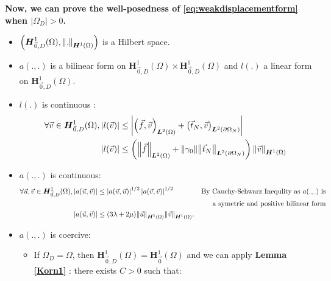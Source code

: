 \documentclass[a4paper,12pt,twoside]{report}
\begin{document}
\noindent \textbf{Now, we can prove the well-posedness of \eqref{eq:weakdisplacementform} when $\left| \Omega_D \right| > 0$.}
\begin{itemize}
    \item $\left(\boldsymbol H^1_{\vec 0,D}(\Omega), \norm{.}_{\boldsymbol H^1(\Omega)} \right)$ is a Hilbert space.
    \item $a(.,.)$ is a bilinear form on $\boldsymbol H^1_{\vec 0,D}(\Omega) \times \boldsymbol H^1_{\vec 0,D}(\Omega)$ and $l(.)$ a linear form on $\boldsymbol H^1_{\vec 0,D}(\Omega)$.
    \item $l(.)$ is continuous : \begin{equation*}
    \begin{aligned}    
    \forall \vec v \in \boldsymbol H^1_{\vec 0,D}(\Omega), \left|l(\vec v)\right| 
    & \leq \left| \left(\vec f, \vec v \right)_{\boldsymbol L^2(\Omega)} + \left(\vec t_N, \vec v \right)_{\boldsymbol L^2(\partial \Omega_N)} \right| \\
    \left|l(\vec v)\right| 
    & \leq \left( \norm{\vec f}_{\boldsymbol L^2(\Omega)} + \norm{\gamma_0} \norm{\vec t_N}_{\boldsymbol L^2(\partial \Omega_N)}\right)\norm{\vec v}_{\boldsymbol H^1(\Omega)}\\
    \end{aligned}
    \end{equation*}
    \item $a(.,.)$ is continuous: 
    \begin{equation*}
        \begin{aligned}
        \forall \vec u, \vec v \in \boldsymbol H^1_{\vec 0,D}(\Omega), \left| a(\vec u, \vec v) \right| 
        & \leq \left| a(\vec u, \vec u) \right|^{1/2} \left| a(\vec v, \vec v) \right|^{1/2} & \text{By Cauchy-Schwarz Inequlity as $a(.,.)$ is} \\
        & & \text{a symetric and positive bilinear form} \\
        \left| a(\vec u, \vec v) \right| & \leq (3\lambda + 2\mu)\norm{\vec u}_{\boldsymbol H^1(\Omega)}\norm{\vec v}_{\boldsymbol H^1(\Omega)}.
        \end{aligned}
    \end{equation*}
    \item $a(.,.)$ is coercive: 
        \begin{itemize}
            \item If $\Omega_D = \Omega$, then $\boldsymbol H^1_{\vec 0,D}(\Omega) = \boldsymbol H^1_{\vec 0}(\Omega)$ and we can apply \textbf{Lemma \ref{Korn1}} : there exists $C > 0$ such that:

\end{itemize}
\end{itemize}
\end{document}
